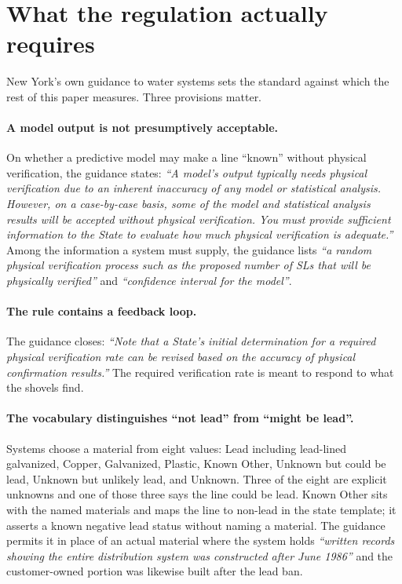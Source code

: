 \documentclass[11pt]{article}
\newcommand{\KO}{\textsf{Known Other}}
\newcommand{\CBL}{\textsf{Unknown but could be lead}}
\begin{document}
\section{What the regulation actually requires}\label{sec:rules}

New York's own guidance to water systems \cite{nysdohguidance2025} sets the standard against
which the rest of this paper measures. Three provisions matter.

\paragraph{A model output is not presumptively acceptable.}
On whether a predictive model may make a line ``known'' without physical verification, the
guidance states: \emph{``A model's output typically needs physical verification due to an
inherent inaccuracy of any model or statistical analysis. However, on a case-by-case basis,
some of the model and statistical analysis results will be accepted without physical
verification. You must provide sufficient information to the State to evaluate how much
physical verification is adequate.''} Among the information a system must supply, the
guidance lists \emph{``a random physical verification process such as the proposed number of
SLs that will be physically verified''} and \emph{``confidence interval for the model''}.

\paragraph{The rule contains a feedback loop.}
The guidance closes: \emph{``Note that a State's initial determination for a required physical
verification rate can be revised based on the accuracy of physical confirmation results.''}
The required verification rate is meant to respond to what the shovels find.

\paragraph{The vocabulary distinguishes ``not lead'' from ``might be lead''.}
Systems choose a material from eight values: \textsf{Lead including lead-lined galvanized},
\textsf{Copper}, \textsf{Galvanized}, \textsf{Plastic}, \KO{}, \CBL{}, \textsf{Unknown but
unlikely lead}, and \textsf{Unknown}. Three of the eight are explicit unknowns and one of
those three says the line could be lead. \KO{} sits with the named materials and maps the
line to non-lead in the state template; it asserts a known negative lead status without
naming a material. The guidance permits it in place of an actual material where the system
holds \emph{``written records showing the entire distribution system was constructed after
June 1986''} and the customer-owned portion was likewise built after the lead ban.
\end{document}
